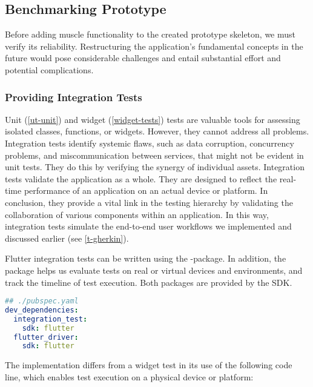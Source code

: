 
\subsection{Benchmarking Prototype} \label{benchmark}

Before adding muscle functionality to the created prototype skeleton, we must verify its reliability. Restructuring the 
application's fundamental concepts in the future would pose considerable challenges and entail substantial effort and 
potential complications.


\subsubsection{Providing Integration Tests} \label{int-tests}

Unit (\ref{ut-unit}) and widget (\ref{widget-tests}) tests are valuable tools for assessing isolated classes, functions, 
or widgets. However, they cannot address all problems. Integration tests identify systemic flaws, such as data 
corruption, concurrency problems, and miscommunication between services, that might not be evident in unit tests. They 
do this by verifying the synergy of individual assets. Integration tests validate the application as a whole. They are 
designed to reflect the real-time performance of an application on an actual device or platform. In conclusion, they 
provide a vital link in the testing hierarchy by validating the collaboration of various components within an 
application. In this way, integration tests simulate the end-to-end user workflows we implemented and discussed earlier 
(see \ref{t-gherkin}).

Flutter integration tests can be written using the -package. In addition, the  
package helps us evaluate tests on real or virtual devices and environments, and track the timeline of test execution. 
Both packages are provided by the SDK.

\begin{lstlisting}[language=yaml]
## ./pubspec.yaml
dev_dependencies:
  integration_test:
    sdk: flutter
  flutter_driver: 
    sdk: flutter
\end{lstlisting}

\noindent The implementation differs from a widget test in its use of the following code line, which enables test 
execution on a physical device or platform:

